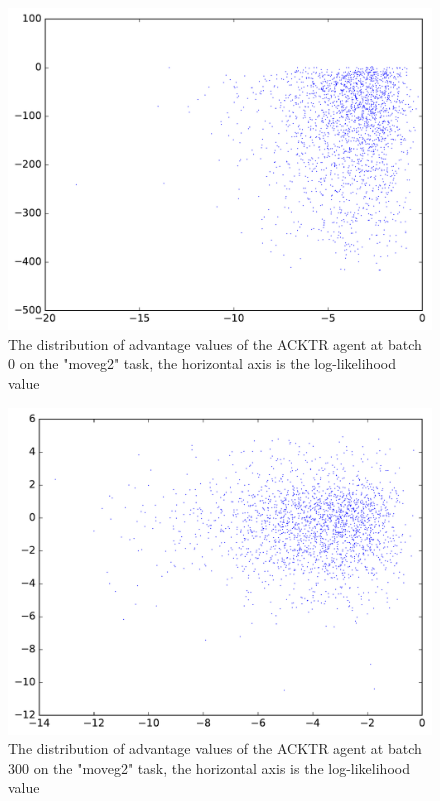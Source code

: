 \begin{figure}[!htbp]
	\includegraphics[width=\textwidth]{images/vis_stats_0.pdf}
	\centering
	\caption{The distribution of advantage values of the ACKTR agent at batch 0 on the "moveg2" task, the horizontal axis is the log-likelihood value}
	\label{vis_stats_0}
\end{figure}

\begin{figure}[!htbp]
	\includegraphics[width=\textwidth]{images/vis_stats_3000.pdf}
	\centering
	\caption{The distribution of advantage values of the ACKTR agent at batch 300 on the "moveg2" task, the horizontal axis is the log-likelihood value}
	\label{vis_stats_3000}
\end{figure}

